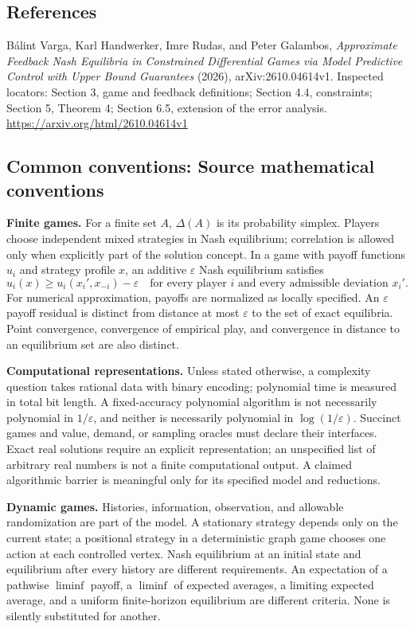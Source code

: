 \documentclass[11pt,a4paper]{article}
\begin{document}
\subsection*{References}
\begingroup\footnotesize\raggedright
\noindent [S1] B\'alint Varga, Karl Handwerker, Imre Rudas, and Peter Galambos, \emph{Approximate Feedback Nash Equilibria in Constrained Differential Games via Model Predictive Control with Upper Bound Guarantees} (2026), arXiv:2610.04614v1. Inspected locators: Section 3, game and feedback definitions; Section 4.4, constraints; Section 5, Theorem 4; Section 6.5, extension of the error analysis.
\url{https://arxiv.org/html/2610.04614v1}
\par\endgroup

\subsection*{Common conventions: Source mathematical conventions}

\textbf{Finite games.} For a finite set $A$, $\Delta(A)$ is its probability
simplex. Players choose independent mixed strategies in Nash equilibrium;
correlation is allowed only when explicitly part of the solution concept.
In a game with payoff functions $u_i$ and strategy profile $x$, an additive
$\varepsilon$ Nash equilibrium satisfies
\[
 u_i(x)\geq u_i(x_i',x_{-i})-\varepsilon
 \quad\text{for every player $i$ and every admissible deviation $x_i'$}.
\]
For numerical approximation, payoffs are normalized as locally specified.
An $\varepsilon$ payoff residual is distinct from distance at most
$\varepsilon$ to the set of exact equilibria. Point convergence, convergence
of empirical play, and convergence in distance to an equilibrium set are
also distinct.

\textbf{Computational representations.} Unless stated otherwise, a complexity
question takes rational data with binary encoding; polynomial time is measured
in total bit length. A fixed-accuracy polynomial algorithm is not necessarily
polynomial in $1/\varepsilon$, and neither is necessarily polynomial in
$\log(1/\varepsilon)$. Succinct games and value, demand, or sampling oracles
must declare their interfaces. Exact real solutions require an explicit
representation; an unspecified list of arbitrary real numbers is not a
finite computational output. A claimed algorithmic barrier is meaningful
only for its specified model and reductions.

\textbf{Dynamic games.} Histories, information, observation, and allowable
randomization are part of the model. A stationary strategy depends only on
the current state; a positional strategy in a deterministic graph game
chooses one action at each controlled vertex. Nash equilibrium at an initial
state and equilibrium after every history are different requirements.
An expectation of a pathwise $\liminf$ payoff, a $\liminf$ of expected averages,
a limiting expected average, and a uniform finite-horizon equilibrium are
different criteria. None is silently substituted for another.
\end{document}
